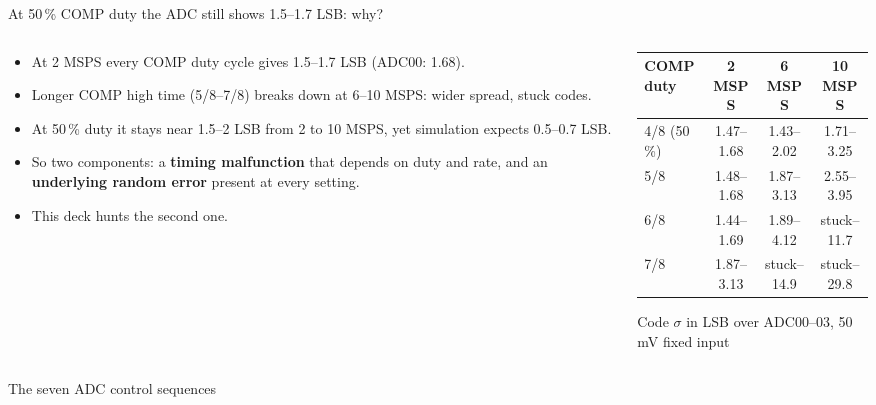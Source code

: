 \begin{frame}{At 50\,\% COMP duty the ADC still shows 1.5--1.7 LSB: why?}
  \begin{columns}[c]
    \begin{column}{0.48\textwidth}
      \small
      \begin{itemize}
        \item At 2 MSPS every COMP duty cycle gives 1.5--1.7 LSB (ADC00: 1.68).
        \item Longer COMP high time (5/8--7/8) breaks down at 6--10 MSPS: wider spread, stuck codes.
        \item At 50\,\% duty it stays near 1.5--2 LSB from 2 to 10 MSPS, yet simulation expects 0.5--0.7 LSB.
        \item So two components: a \textbf{timing malfunction} that depends on duty and rate, and an \textbf{underlying random error} present at every setting.
        \item This deck hunts the second one.
      \end{itemize}
    \end{column}
    \begin{column}{0.50\textwidth}
      \centering
      {\footnotesize\setlength{\tabcolsep}{4pt}
      \begin{tabular}{@{}lccc@{}}
        \toprule
        COMP duty & 2 MSPS & 6 MSPS & 10 MSPS \\
        \midrule
        4/8 (50\,\%) & 1.47--1.68 & 1.43--2.02 & 1.71--3.25 \\
        5/8 & 1.48--1.68 & 1.87--3.13 & 2.55--3.95 \\
        6/8 & 1.44--1.69 & 1.89--4.12 & stuck--11.7 \\
        7/8 & 1.87--3.13 & stuck--14.9 & stuck--29.8 \\
        \bottomrule
      \end{tabular}
      \par\smallskip
      Code $\sigma$ in LSB over ADC00--03, 50 mV fixed input}
    \end{column}
  \end{columns}
\end{frame}

\begin{frame}{The seven ADC control sequences}
  \centering
  \hfill{}\par
  \hfill{}\par
  \hfill{}\par
  \par
\end{frame}

